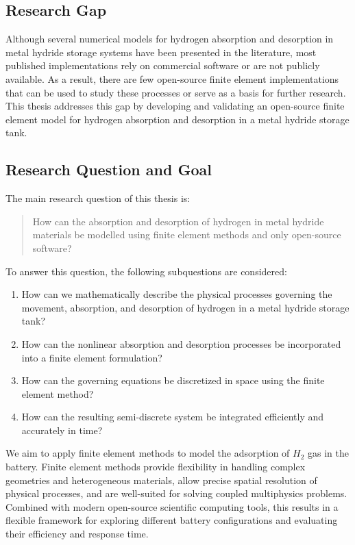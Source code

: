 \subsection{Research Gap}

Although several numerical models for hydrogen absorption and desorption in metal hydride storage systems have been presented in the literature, most published implementations rely on commercial software or are not publicly available. As a result, there are few open-source finite element implementations that can be used to study these processes or serve as a basis for further research. This thesis addresses this gap by developing and validating an open-source finite element model for hydrogen absorption and desorption in a metal hydride storage tank.

\subsection{Research Question and Goal}

The main research question of this thesis is:

\begin{quote}
How can the absorption and desorption of hydrogen in metal hydride materials be modelled using finite element methods and only open-source software?
\end{quote}
To answer this question, the following subquestions are considered:

\begin{enumerate}
    \item How can we mathematically describe the physical processes governing the movement, absorption, and desorption of hydrogen in a metal hydride storage tank?
    \item How can the nonlinear absorption and desorption processes be incorporated into a finite element formulation?
    \item How can the governing equations be discretized in space using the finite element method?
    \item How can the resulting semi-discrete system be integrated efficiently and accurately in time?
\end{enumerate}

We aim to apply finite element methods to model the adsorption of $H_2$ gas in the battery. Finite element methods provide flexibility in handling complex geometries and heterogeneous materials, allow precise spatial resolution of physical processes, and are well-suited for solving coupled multiphysics problems. Combined with modern open-source scientific computing tools, this results in a flexible framework for exploring different battery configurations and evaluating their efficiency and response time.

